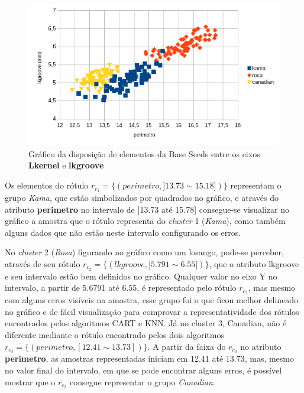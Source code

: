 \begin{figure}[h!]
        \centering
        \includegraphics[scale=0.9]{figs/grafico_CART_KNN_SEEDS_perimetro_lkgroove.png}
        \caption{Gráfico da disposição de elementos da Base Seeds entre os eixos \textbf{Lkernel} e \textbf{lkgroove}} \label{fig:grafico_CART_KNN_SEEDS_perimetro_lkgroove}
\end{figure}


Os elementos do rótulo $r_{c_1}=\{ (perimetro, ]13.73 \sim 15.18]) \} $ representam o grupo \textit{Kama}, que estão simbolizados por quadrados no gráfico, e através do atributo \textbf{perimetro} no intervalo de ]13.73 até 15.78] consegue-se visualizar no gráfico a amostra que o rótulo representa do \textit{cluster} 1 (\textit{Kama}), como também alguns dados que não estão neste intervalo configurando os erros. 


No \textit{cluster} 2 (\textit{Rosa}) figurando no gráfico como um losango, pode-se perceber, através de seu rótulo $r_{c_2}=\{ (lkgroove, ] 5.791 \sim  6.55]) \}$, que o atributo lkgroove e seu intervalo estão bem definidos no gráfico. Qualquer valor no eixo Y no intervalo, a partir de 5.6791 até 6.55, é representado pelo rótulo ${r_{c_2}}$, mas mesmo com alguns erros visíveis na amostra, esse grupo foi o que ficou melhor delineado no gráfico e de fácil visualização para comprovar a representatividade dos rótulos encontrados pelos algoritmos CART e KNN. Já no cluster 3, Canadian, não é diferente mediante o rótulo encontrado pelos dois algoritmos $r_{c_3}=\{ (perimetro, [12.41 \sim  13.73])\}$. A partir da faixa do ${r_{c_3}}$ no atributo \textbf{perimetro}, as amostras representadas iniciam em 12.41 até 13.73, mas, mesmo no valor final do intervalo, em que se pode encontrar alguns erros, é possível mostrar que o ${r_{c_3}}$ consegue representar o grupo \textit{Canadian}. 

